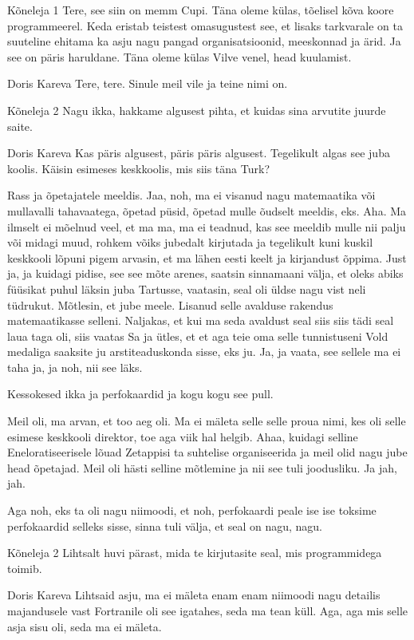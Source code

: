 Kõneleja 1
Tere, see siin on memm Cupi. Täna oleme külas, tõelisel kõva koore programmeerel. Keda eristab teistest omasugustest see, et lisaks tarkvarale on ta suuteline ehitama ka asju nagu pangad organisatsioonid, meeskonnad ja ärid. Ja see on päris haruldane. Täna oleme külas Vilve venel, head kuulamist. 

Doris Kareva
Tere, tere. Sinule meil vile ja teine nimi on. 

Kõneleja 2
Nagu ikka, hakkame algusest pihta, et kuidas sina arvutite juurde saite. 

Doris Kareva
Kas päris algusest, päris päris algusest. Tegelikult algas see juba koolis. Käisin esimeses keskkoolis, mis siis täna Turk? 

Rass ja õpetajatele meeldis. Jaa, noh, ma ei visanud nagu matemaatika või mullavalli tahavaatega, õpetad püsid, õpetad mulle õudselt meeldis, eks. Aha. Ma ilmselt ei mõelnud veel, et ma ma, ma ei teadnud, kas see meeldib mulle nii palju või midagi muud, rohkem võiks jubedalt kirjutada ja tegelikult kuni kuskil keskkooli lõpuni pigem arvasin, et ma lähen eesti keelt ja kirjandust õppima. Just ja, ja kuidagi pidise, see see mõte arenes, saatsin sinnamaani välja, et oleks abiks füüsikat puhul läksin juba Tartusse, vaatasin, seal oli üldse nagu vist neli tüdrukut. Mõtlesin, et jube meele. Lisanud selle avalduse rakendus matemaatikasse selleni. Naljakas, et kui ma seda avaldust seal siis siis tädi seal laua taga oli, siis vaatas Sa ja ütles, et et aga teie oma selle tunnistuseni Vold medaliga saaksite ju arstiteaduskonda sisse, eks ju. Ja, ja vaata, see sellele ma ei taha ja, ja noh, nii see läks. 

Kessokesed ikka ja perfokaardid ja kogu kogu see pull. 

Meil oli, ma arvan, et too aeg oli. Ma ei mäleta selle selle proua nimi, kes oli selle esimese keskkooli direktor, toe aga viik hal helgib. Ahaa, kuidagi selline Eneloratiseerisele lõuad Zetappisi ta suhtelise organiseerida ja meil olid nagu jube head õpetajad. Meil oli hästi selline mõtlemine ja nii see tuli joodusliku. Ja jah, jah. 

Aga noh, eks ta oli nagu niimoodi, et noh, perfokaardi peale ise ise toksime perfokaardid selleks sisse, sinna tuli välja, et seal on nagu, nagu. 

Kõneleja 2
Lihtsalt huvi pärast, mida te kirjutasite seal, mis programmidega toimib. 

Doris Kareva
Lihtsaid asju, ma ei mäleta enam enam niimoodi nagu detailis majandusele vast Fortranile oli see igatahes, seda ma tean küll. Aga, aga mis selle asja sisu oli, seda ma ei mäleta. 

